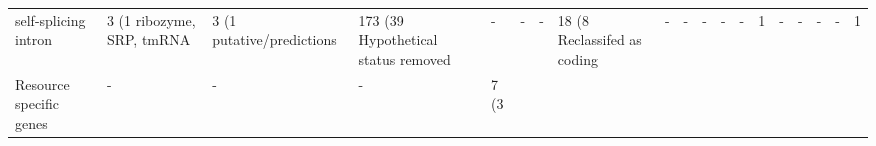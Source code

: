 {\begin{tabular}{llllllllllll}
\hspace{1em}self-splicing intron & 3 (1 %
\hspace{1em}ribozyme, SRP, tmRNA & 3 (1 %
\hspace{1em}putative/predictions & 173 (39 %
Hypothetical status removed & - & - & - & 18 (8 %
Reclassifed as coding & - & - & - & - & - & 1 & - & - & - & - & 1\\
Resource specific genes & - & - & - & 7 (3 %
\bottomrule
\end{tabular}}
